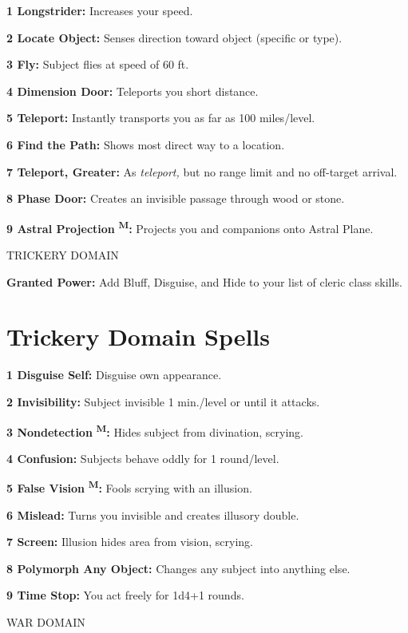 \documentclass{article}
\begin{document}
\textbf{1 Longstrider: }Increases your speed.

\textbf{2 Locate Object: }Senses direction toward object (specific or type).

\textbf{3 Fly: }Subject flies at speed of 60 ft.

\textbf{4 Dimension Door: }Teleports you short distance.

\textbf{5 Teleport: }Instantly transports you as far as 100 miles/level.

\textbf{6 Find the Path: }Shows most direct way to a location.

\textbf{7 Teleport, Greater:} As \textit{teleport, }but no range limit and no off-target 
arrival.

\textbf{8 Phase Door: }Creates an invisible passage through wood or stone.

\textbf{9 Astral Projection }\textsuperscript{\textbf{M}}\textbf{: }Projects you 
and companions onto Astral Plane.

\vspace{12pt}
TRICKERY DOMAIN

\textbf{Granted Power:} Add Bluff, Disguise, and Hide to your list of cleric class 
skills.

\section*{\textbf{Trickery Domain Spells}}

\textbf{1 Disguise Self: }Disguise own appearance.

\textbf{2 Invisibility: }Subject invisible 1 min./level or until it attacks.

\textbf{3 Nondetection }\textsuperscript{\textbf{M}}\textbf{: }Hides subject from 
divination, scrying.

\textbf{4 Confusion:} Subjects behave oddly for 1 round/level.

\textbf{5 False Vision }\textsuperscript{\textbf{M}}\textbf{:} Fools scrying with 
an illusion.

\textbf{6 Mislead: }Turns you invisible and creates illusory double.

\textbf{7 Screen: }Illusion hides area from vision, scrying.

\textbf{8 Polymorph Any Object:} Changes any subject into anything else.

\textbf{9 Time Stop: }You act freely for 1d4+1 rounds.

\vspace{12pt}
WAR DOMAIN
\end{document}
